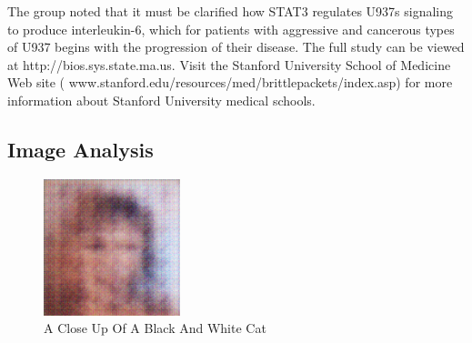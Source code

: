 \documentclass{article}%
\begin{document}
The group noted that it must be clarified how STAT3 regulates U937s signaling to produce interleukin{-}6, which for patients with aggressive and cancerous types of U937 begins with the progression of their disease.\newline%
The full study can be viewed at http://bios.sys.state.ma.us.\newline%
Visit the Stanford University School of Medicine Web site ( www.stanford.edu/resources/med/brittlepackets/index.asp) for more information about Stanford University medical schools.

%
\subsection{Image Analysis}%
\label{subsec:ImageAnalysis}%


\begin{figure}[h!]%
\centering%
\includegraphics[width=150px]{500_fake_images/samples_5_238.png}%
\caption{A Close Up Of A Black And White Cat}%
\end{figure}

%
\end{document}
